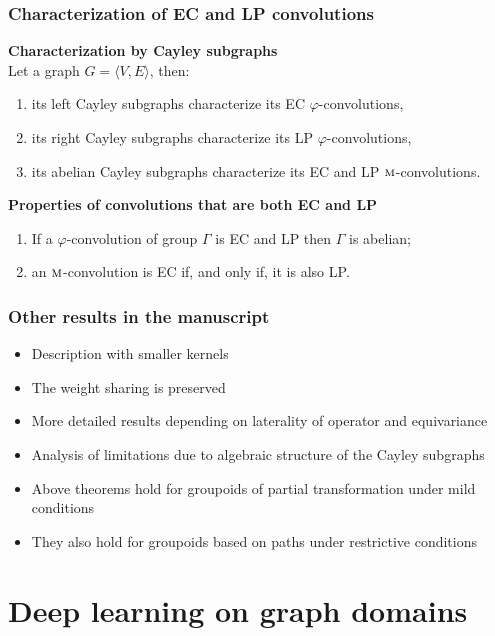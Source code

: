 \documentclass[t,9pt,pdftex]{beamer}
\theoremstyle{definition}
\DeclareMathOperator{\M}{\textsc{m}}
\newcommand{\gve}{G = \langle V, E \rangle}
\begin{document}
\begin{frame}[c, label=current]
  \frametitle{Characterization of EC and LP convolutions}
  \begin{theorem}\textbf{Characterization by Cayley subgraphs}\\
  Let a graph $\gve$, then:
  \begin{enumerate}
  \item its left Cayley subgraphs characterize its EC $\varphi$-convolutions,
  \item its right Cayley subgraphs characterize its LP $\varphi$-convolutions,
  \item its abelian Cayley subgraphs characterize its EC and LP $\M$-convolutions.
  \end{enumerate}
  \label{th:cayleychar}
  \end{theorem}

  \begin{corollary}\textbf{Properties of convolutions that are both EC and LP}\\
  \begin{enumerate}
  \item If a $\varphi$-convolution of group $\Gamma$ is EC and LP then $\Gamma$ is abelian;
  \item an $\M$-convolution is EC if, and only if, it is also LP.
  \end{enumerate}
  \end{corollary}
\end{frame}

\begin{frame}[c, label=current]
  \frametitle{Other results in the manuscript}
\begin{itemize}
    \item Description with smaller kernels
    \item The weight sharing is preserved
    \item More detailed results depending on laterality of operator and equivariance
    \item Analysis of limitations due to algebraic structure of the Cayley subgraphs
    \item Above theorems hold for groupoids of partial transformation under mild conditions
    \item They also hold for groupoids based on paths under restrictive conditions
  \end{itemize}
\end{frame}

\section{Deep learning on graph domains}
\end{document}
